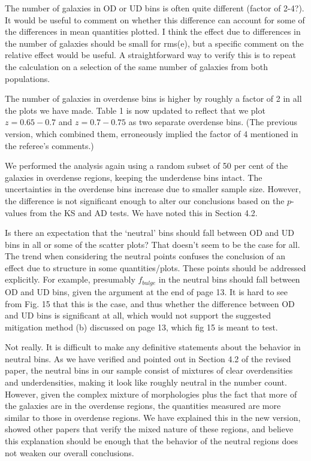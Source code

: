 \documentclass[english]{letter}
\begin{document}
\begin{shaded}
The number of galaxies in OD or UD bins is often quite different (factor of 2-4?). It would be useful to comment on whether this difference can account for some of the differences in mean quantities plotted. I think the effect due to differences in the number of galaxies should be small for rms(e), but a specific comment on the relative effect would be useful. A straightforward way to verify this is to repeat the calculation on a selection of the same number of galaxies from both populations.
\end{shaded}
\noindent 
The number of
galaxies in overdense bins is higher by roughly a factor of 2 in all the plots we have made. Table 1
is now updated to reflect that we plot $z=0.65-0.7$ and $z=0.7-0.75$ as two separate overdense bins.
(The previous version, which combined them, erroneously implied the factor of 4 mentioned in the
referee's comments.)

We performed the analysis again using a random subset of 50 per cent of the galaxies in overdense
regions, keeping the underdense bins intact. The uncertainties in the overdense bins increase due
to smaller sample size. However, the difference is not significant enough to alter our conclusions
based on the $p$-values from the KS and AD tests. We have noted this in Section 4.2.

\begin{shaded}
Is there an expectation that the `neutral' bins should fall between OD and UD bins in all or some of the scatter plots? That doesn't seem to be the case for all. The trend when considering the neutral points confuses the conclusion of an effect due to structure in some quantities/plots. These points should be addressed explicitly. For example, presumably $f_{bulge}$ in the neutral bins should fall between OD and UD bins, given the argument at the end of page 13. It is hard to see from Fig. 15 that this is the case, and thus whether the difference between OD and UD bins is significant at all, which would not support the suggested mitigation method (b) discussed on page 13, which fig 15 is meant to test.
\end{shaded}

Not really. It is difficult to make any definitive statements about the behavior in neutral bins. As
we have verified and pointed out in Section 4.2 of the revised paper,
the neutral bins in our sample consist of mixtures of clear overdensities and underdensities, making
it look like roughly neutral in the number count. However, given the complex mixture of morphologies
plus the fact that more of the galaxies are in the overdense regions, the quantities measured are
more similar to those in overdense regions.  We have explained this in the new version, showed other
papers that verify the mixed nature of these regions, and believe this explanation should be enough
that the behavior of the neutral regions does not weaken our overall conclusions.
\end{document}
